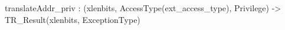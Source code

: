 translateAddr_priv : (xlenbits, AccessType(ext_access_type), Privilege) -> TR_Result(xlenbits, ExceptionType)